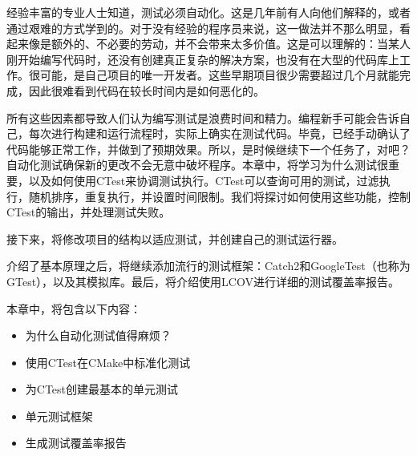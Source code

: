 经验丰富的专业人士知道，测试必须自动化。这是几年前有人向他们解释的，或者通过艰难的方式学到的。对于没有经验的程序员来说，这一做法并不那么明显，看起来像是额外的、不必要的劳动，并不会带来太多价值。这是可以理解的：当某人刚开始编写代码时，还没有创建真正复杂的解决方案，也没有在大型的代码库上工作。很可能，是自己项目的唯一开发者。这些早期项目很少需要超过几个月就能完成，因此很难看到代码在较长时间内是如何恶化的。

所有这些因素都导致人们认为编写测试是浪费时间和精力。编程新手可能会告诉自己，每次进行构建和运行流程时，实际上确实在测试代码。毕竟，已经手动确认了代码能够正常工作，并做到了预期效果。所以，是时候继续下一个任务了，对吧？自动化测试确保新的更改不会无意中破坏程序。本章中，将学习为什么测试很重要，以及如何使用CTest来协调测试执行。CTest可以查询可用的测试，过滤执行，随机排序，重复执行，并设置时间限制。我们将探讨如何使用这些功能，控制CTest的输出，并处理测试失败。

接下来，将修改项目的结构以适应测试，并创建自己的测试运行器。

介绍了基本原理之后，将继续添加流行的测试框架：Catch2和GoogleTest（也称为GTest），以及其模拟库。最后，将介绍使用LCOV进行详细的测试覆盖率报告。

本章中，将包含以下内容：

\begin{itemize}
\item
为什么自动化测试值得麻烦？

\item
使用CTest在CMake中标准化测试

\item
为CTest创建最基本的单元测试

\item
单元测试框架

\item
生成测试覆盖率报告
\end{itemize}




















